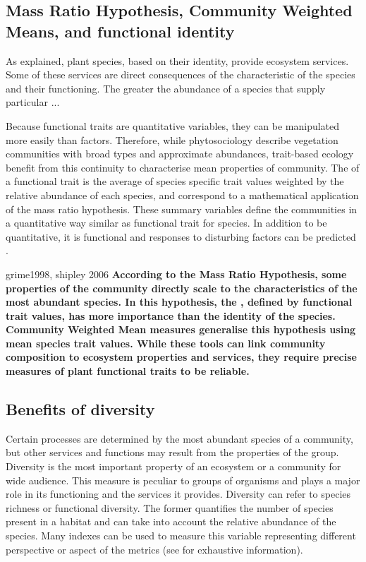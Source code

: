 \subsection{Mass Ratio Hypothesis, Community Weighted Means, and functional identity}

As explained, plant species, based on their identity, provide ecosystem services. Some of these services are direct consequences of the characteristic of the species and their functioning. The greater the abundance of a species that supply particular ...

Because functional traits are quantitative variables, they can be manipulated more easily than factors. Therefore, while phytosociology describe vegetation communities with broad types and approximate abundances, trait-based ecology benefit from this continuity to characterise mean properties of community. The  of a functional trait is the average of species specific trait values weighted by the relative abundance of each species, and correspond to a mathematical application of the mass ratio hypothesis. These summary variables define the communities in a quantitative way similar as functional trait for species. In addition to be quantitative, it is functional and responses to disturbing factors can be predicted \parencite{lavorel_predicting_2002}.


grime1998, shipley 2006
\textbf{According to the Mass Ratio Hypothesis, some properties of the community directly scale to the characteristics of the most abundant species. In this hypothesis, the , defined by functional trait values, has more importance than the identity of the species. Community Weighted Mean measures generalise this hypothesis using mean species trait values. While these tools can link community composition to ecosystem properties and services, they require precise measures of plant functional traits to be reliable.}

\subsection{Benefits of diversity}

Certain processes are determined by the most abundant species of a community, but other services and functions may result from the properties of the group. Diversity is the most important property of an ecosystem or a community for wide audience. This measure is peculiar to groups of organisms and plays a major role in its functioning and the services it provides. Diversity can refer to species richness or functional diversity. The former quantifies the number of species present in a habitat and can take into account the relative abundance of the species. Many indexes can be used to measure this variable representing different perspective or aspect of the metrics (see \cite{chalmandrier_communities_2015} for exhaustive information).


